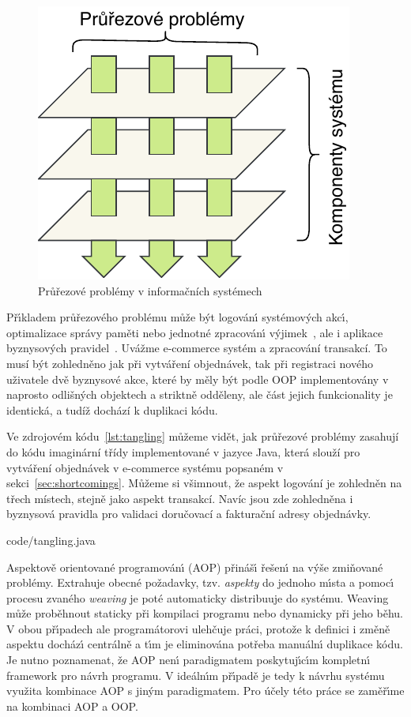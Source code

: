 \begin{figure}[t]
    \centering
    \includegraphics[keepaspectratio=true, width=0.35\linewidth]{figures/cross-cutting.pdf}
    \caption{Průřezové problémy v informačních systémech}
    \label{fig:cross-cutting}
\end{figure}

Př\'{\i}kladem průřezového problému může b\'yt logován\'{\i}
systémov\'ych akc\'{\i}, optimalizace správy paměti
nebo jednotné zpracován\'{\i} v\'yjimek~\cite{kiczales1997aspect},
ale i aplikace byznysových pravidel~\cite{cemus2014aspect}.
Uvážme e-commerce systém a zpracování transakcí. To musí
být zohledněno jak při vytváření objednávek, tak při registraci
nového uživatele \textendash\xspace dvě byznysové akce, které by měly
být podle \gls{OOP} implementovány v naprosto odlišných objektech
a striktně odděleny, ale část jejich funkcionality je identická,
a tudíž dochází k duplikaci kódu.

Ve zdrojovém kódu~\ref{lst:tangling} můžeme vidět, jak průřezové
problémy zasahují do kódu imaginární třídy implementované v
jazyce Java, která slouží pro vytváření objednávek v e-commerce
systému popsaném v sekci~\ref{sec:shortcomings}.
Můžeme si všimnout, že aspekt logování je zohledněn na třech
místech, stejně jako aspekt transakcí. Navíc jsou zde zohledněna
i byznysová pravidla pro validaci doručovací a fakturační adresy
objednávky.


{code/tangling.java}

Aspektově orientované programován\'{\i} (\gls{AOP}) přináš\'{\i} řešen\'{\i} na
v\'yše zmiňované problémy. Extrahuje obecné požadavky,
tzv. \textit{aspekty} do jednoho m\'{\i}sta a pomoc\'{\i} procesu zvaného
\textit{weaving} je poté automaticky distribuuje do systému.
Weaving může proběhnout staticky při kompilaci programu nebo dynamicky
při jeho běhu. V obou př\'{\i}padech ale programátorovi ulehčuje práci,
protože k definici i změně aspektu docház\'{\i} centrálně a t\'{\i}m je eliminována
potřeba manuáln\'{\i} duplikace kódu. Je nutno poznamenat, že \gls{AOP} nen\'{\i}
paradigmatem poskytuj\'{\i}c\'{\i}m kompletn\'{\i} framework pro návrh programu.
V ideáln\'{\i}m př\'{\i}padě je tedy k návrhu systému využita kombinace
\gls{AOP} s jin\'ym paradigmatem. Pro účely této práce se zaměř\'{\i}me na
kombinaci \gls{AOP} a \gls{OOP}.

